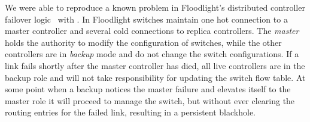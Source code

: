  We were able to reproduce a
known problem in Floodlight's distributed controller failover logic~\cite{floodlight_bug} with
\projectname. In Floodlight switches maintain one hot connection to a master controller and
several cold connections to replica controllers. The \emph{master} holds the
authority to modify the configuration of switches, while the other
controllers are in \emph{backup} mode and do not change the
switch configurations. %
If a link fails shortly after the master
controller has died, all live controllers are in
the backup role and will not take responsibility for updating the switch
flow table. At some point when a backup notices the master failure and
elevates itself to the master role it will proceed to manage
the switch, but without ever clearing the routing entries for
the failed link, resulting in a persistent blackhole.

